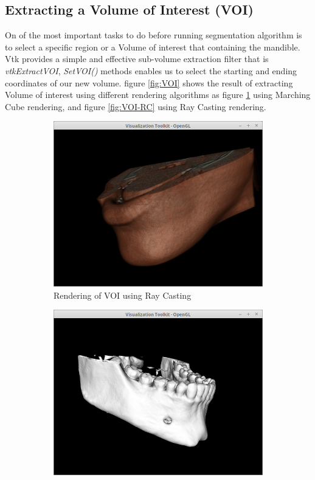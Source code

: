 \documentclass[10pt, b5paper]{article}
\begin{document}
\subsection{Extracting a Volume of Interest (VOI)}
On of the most important tasks to do before running segmentation algorithm is to select a specific region or a Volume of interest that containing the mandible. Vtk provides a simple and effective sub-volume extraction filter that is \textit{vtkExtractVOI}, \textit{SetVOI()} methods enables us to select the starting and ending coordinates of our new volume. figure \ref{fig:VOI} shows the result of extracting Volume of interest using different rendering algorithms as figure \ref{fig:VOI-CM} using Marching Cube rendering, and figure \ref{fig:VOI-RC} using Ray Casting rendering.
\begin{figure}
    \centering
    \begin{subfigure}[b]{0.45\textwidth}
        \centering
        \includegraphics[width=\textwidth]{VOI-RC}
        \caption{Rendering of VOI using Ray Casting}
        \label{fig:VOI-CM}
    \end{subfigure}
    \hfill
    \begin{subfigure}[b]{0.45\textwidth}
        \centering
        \includegraphics[width=\textwidth]{VOI-CM}

\end{subfigure}
\end{figure}
\end{document}
